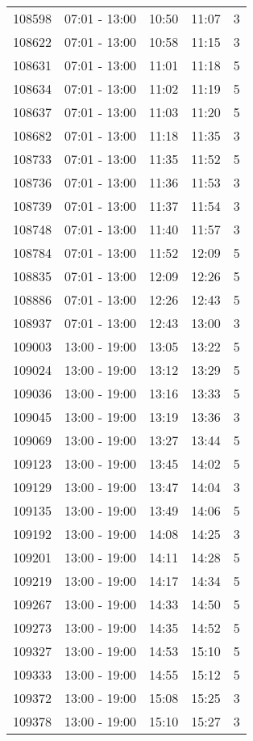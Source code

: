 \documentclass{article}
\begin{document}
\begin{tabular}{llccc}
108598 & 07:01 - 13:00 & 10:50 & 11:07 & 3 \\
108622 & 07:01 - 13:00 & 10:58 & 11:15 & 3 \\
108631 & 07:01 - 13:00 & 11:01 & 11:18 & 5 \\
108634 & 07:01 - 13:00 & 11:02 & 11:19 & 5 \\
108637 & 07:01 - 13:00 & 11:03 & 11:20 & 5 \\
108682 & 07:01 - 13:00 & 11:18 & 11:35 & 3 \\
108733 & 07:01 - 13:00 & 11:35 & 11:52 & 5 \\
108736 & 07:01 - 13:00 & 11:36 & 11:53 & 3 \\
108739 & 07:01 - 13:00 & 11:37 & 11:54 & 3 \\
108748 & 07:01 - 13:00 & 11:40 & 11:57 & 3 \\
108784 & 07:01 - 13:00 & 11:52 & 12:09 & 5 \\
108835 & 07:01 - 13:00 & 12:09 & 12:26 & 5 \\
108886 & 07:01 - 13:00 & 12:26 & 12:43 & 5 \\
108937 & 07:01 - 13:00 & 12:43 & 13:00 & 3 \\
109003 & 13:00 - 19:00 & 13:05 & 13:22 & 5 \\
109024 & 13:00 - 19:00 & 13:12 & 13:29 & 5 \\
109036 & 13:00 - 19:00 & 13:16 & 13:33 & 5 \\
109045 & 13:00 - 19:00 & 13:19 & 13:36 & 3 \\
109069 & 13:00 - 19:00 & 13:27 & 13:44 & 5 \\
109123 & 13:00 - 19:00 & 13:45 & 14:02 & 5 \\
109129 & 13:00 - 19:00 & 13:47 & 14:04 & 3 \\
109135 & 13:00 - 19:00 & 13:49 & 14:06 & 5 \\
109192 & 13:00 - 19:00 & 14:08 & 14:25 & 3 \\
109201 & 13:00 - 19:00 & 14:11 & 14:28 & 5 \\
109219 & 13:00 - 19:00 & 14:17 & 14:34 & 5 \\
109267 & 13:00 - 19:00 & 14:33 & 14:50 & 5 \\
109273 & 13:00 - 19:00 & 14:35 & 14:52 & 5 \\
109327 & 13:00 - 19:00 & 14:53 & 15:10 & 5 \\
109333 & 13:00 - 19:00 & 14:55 & 15:12 & 5 \\
109372 & 13:00 - 19:00 & 15:08 & 15:25 & 3 \\
109378 & 13:00 - 19:00 & 15:10 & 15:27 & 3 \\

\end{tabular}
\end{document}
